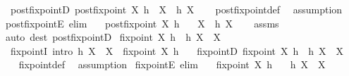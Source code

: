 \begin{isabellebody}
\ \ postfixpointD{\isacharcolon}{\kern0pt}\ {\isachardoublequoteopen}postfixpoint\ X\ h\ {\isasymLongrightarrow}\ X\ {\isasymsubseteq}\ h\ X{\isachardoublequoteclose}\isanewline
%
\isadelimproof
\ \ %
\endisadelimproof
%
\isatagproof
{}\isamarkupfalse%
\ postfixpoint{\isacharunderscore}{\kern0pt}def\ \isamarkupfalse%
\ assumption%
\endisatagproof
{\isafoldproof}%
%
\isadelimproof
\isanewline
%
\endisadelimproof
\isanewline
{}\isamarkupfalse%
\ postfixpointE\ {\isacharbrackleft}{\kern0pt}elim{\isacharbrackright}{\kern0pt}{\isacharcolon}{\kern0pt}\isanewline
\ \ \ {\isachardoublequoteopen}postfixpoint\ X\ h{\isachardoublequoteclose}\isanewline
\ \ \ {\isachardoublequoteopen}X\ {\isasymsubseteq}\ h\ X{\isachardoublequoteclose}\isanewline
%
\isadelimproof
\ \ %
\endisadelimproof
%
\isatagproof
{}\isamarkupfalse%
\ assms\ \isamarkupfalse%
\ {\isacharparenleft}{\kern0pt}auto\ dest{\isacharcolon}{\kern0pt}\ postfixpointD{\isacharparenright}{\kern0pt}%
\endisatagproof
{\isafoldproof}%
%
\isadelimproof
\isanewline
%
\endisadelimproof
\isanewline
{}\isamarkupfalse%
\ {\isachardoublequoteopen}fixpoint\ X\ h\ {\isasymequiv}\ h\ X\ {\isacharequal}{\kern0pt}\ X{\isachardoublequoteclose}\isanewline
\isanewline
{}\isamarkupfalse%
\isanewline
\ \ fixpointI\ {\isacharbrackleft}{\kern0pt}intro{\isacharbang}{\kern0pt}{\isacharbrackright}{\kern0pt}{\isacharcolon}{\kern0pt}\ {\isachardoublequoteopen}h\ X\ {\isacharequal}{\kern0pt}\ X\ {\isasymLongrightarrow}\ fixpoint\ X\ h{\isachardoublequoteclose}\ \isanewline
\ \ fixpointD{\isacharcolon}{\kern0pt}\ {\isachardoublequoteopen}fixpoint\ X\ h\ {\isasymLongrightarrow}\ h\ X\ {\isacharequal}{\kern0pt}\ X{\isachardoublequoteclose}\isanewline
%
\isadelimproof
\ \ %
\endisadelimproof
%
\isatagproof
{}\isamarkupfalse%
\ fixpoint{\isacharunderscore}{\kern0pt}def\ \isamarkupfalse%
\ assumption%
\endisatagproof
{\isafoldproof}%
%
\isadelimproof
\isanewline
%
\endisadelimproof
\isanewline
{}\isamarkupfalse%
\ fixpointE\ {\isacharbrackleft}{\kern0pt}elim{\isacharbrackright}{\kern0pt}{\isacharcolon}{\kern0pt}\isanewline
\ \ \ {\isachardoublequoteopen}fixpoint\ X\ h{\isachardoublequoteclose}\isanewline
\ \ \ {\isachardoublequoteopen}h\ X\ {\isacharequal}{\kern0pt}\ X{\isachardoublequoteclose}\isanewline
%
\isadelimproof
\ \ %
\endisadelimproof
%
\isatagproof
{}\isamarkupfalse%

\end{isabellebody}
